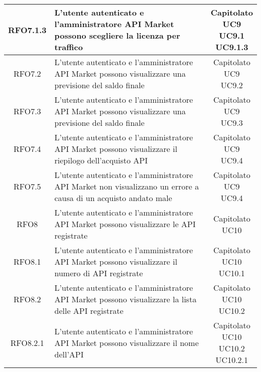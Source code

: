 \begin{longtable}{|c|p{8cm}|c|}
RFO7.1.3 &  L'utente autenticato e l'amministratore API Market possono scegliere la licenza per traffico & \makecell*{Capitolato\\UC9\\UC9.1\\UC9.1.3} \\
\hline

RFO7.2 &  L'utente autenticato e l'amministratore API Market possono visualizzare una previsione del saldo finale & \makecell*{Capitolato\\UC9\\UC9.2} \\
\hline

RFO7.3 & L'utente autenticato e l'amministratore API Market possono visualizzare una previsione del saldo finale & \makecell*{Capitolato\\UC9\\UC9.3} \\
\hline

RFO7.4 &  L'utente autenticato e l'amministratore API Market possono visualizzare il riepilogo dell'acquisto API & \makecell*{Capitolato\\UC9\\UC9.4} \\
\hline

RFO7.5 &  L'utente autenticato e l'amministratore API Market non visualizzano un errore a causa di un acquisto andato male & \makecell*{Capitolato\\UC9\\UC9.4} \\
\hline

RFO8 &  L'utente autenticato e l'amministratore API Market possono visualizzare le API registrate & \makecell*{Capitolato\\UC10} \\
\hline

RFO8.1 &  L'utente autenticato e l'amministratore API Market possono visualizzare il numero di API registrate & \makecell*{Capitolato\\UC10\\UC10.1} \\
\hline

RFO8.2 &  L'utente autenticato e l'amministratore API Market possono visualizzare la lista delle API registrate & \makecell*{Capitolato\\UC10\\UC10.2} \\
\hline

RFO8.2.1 &  L'utente autenticato e l'amministratore API Market possono visualizzare il nome dell'API & \makecell*{Capitolato\\UC10\\UC10.2\\UC10.2.1} \\
\hline


\end{longtable}
